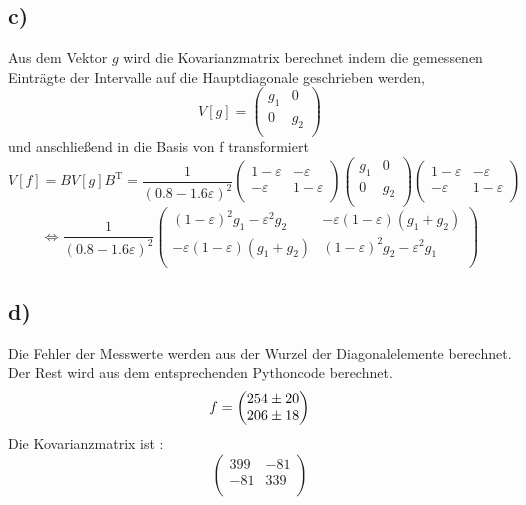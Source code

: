 \subsection*{c)}
Aus dem Vektor $g$ wird die Kovarianzmatrix berechnet indem die gemessenen Einträgte  der Intervalle auf die Hauptdiagonale geschrieben werden,
\begin{equation}
  V[g] =   
  \begin{pmatrix}
    g_1 & 0 \\
    0 & g_2 \\
  \end{pmatrix}
\end{equation}
und anschließend in die Basis von f transformiert 
\begin{equation}
  V[f] = B V[g] B^\text{T} = \frac{1}{(0.8 - 1.6 \varepsilon)^2}
  \begin{pmatrix}
    1 - \varepsilon & - \varepsilon \\
    - \varepsilon & 1 - \varepsilon \\
  \end{pmatrix}
  \begin{pmatrix}
    g_1 & 0 \\
    0 & g_2 \\
  \end{pmatrix}
  \begin{pmatrix}
    1 - \varepsilon & - \varepsilon \\
    - \varepsilon & 1 - \varepsilon \\
  \end{pmatrix}
\end{equation}
\begin{equation}
  \Leftrightarrow \frac{1}{(0.8 - 1.6 \varepsilon)^2}
  \begin{pmatrix}
    (1 - \varepsilon)^2 g_1 - \varepsilon^2 g_2 & -\varepsilon(1-\varepsilon)(g_1 +g_2) \\
    -\varepsilon(1-\varepsilon)(g_1 +g_2) & (1 - \varepsilon)^2 g_2 - \varepsilon^2 g_1  \\
  \end{pmatrix}
\end{equation}
\subsection*{d)}
Die Fehler der Messwerte werden aus der Wurzel der Diagonalelemente berechnet. Der Rest wird aus dem entsprechenden Pythoncode berechnet.
\begin{equation}
  f = \begin{pmatrix}
    \num{254 +- 20}\\
    \num{206 +- 18}\\
    \end{pmatrix}
\end{equation}
Die Kovarianzmatrix ist :
\begin{equation}
  \begin{pmatrix}
    399 & -81 \\
    -81 & 339 \\
  \end{pmatrix}
\end{equation}

